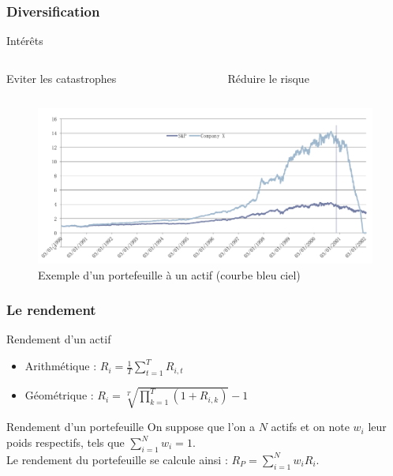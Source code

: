 \begin{frame}
    \frametitle{Diversification} 
      \begin{block}{Intérêts}
	\begin{enumerate}
	  \begin{columns}
	    \begin{column}{4cm}
	      \item Eviter les catastrophes
	    \end{column}
	    \begin{column}{4cm}
	      \item Réduire le risque	   
	    \end{column}
	  \end{columns}
	\end{enumerate}
      \end{block}
      \begin{figure}
	  \includegraphics[scale=0.2]{images/exempleChuteEntreprise.png}   
	  \caption{Exemple d'un portefeuille à un actif (courbe bleu ciel)}
      \end{figure}  
\end{frame}



\begin{frame}
    \frametitle{Le rendement} 
    \begin{block}{Rendement d'un actif}
	\begin{itemize}
	 \item Arithmétique :  $R_{i} = \frac{1}{T} \sum_{t=1}^T R_{i,t}$
	 \item Géométrique :  $ R_{i} = \sqrt[T]{\prod_{k=1}^{T}(1+R_{i,k})}-1$
	\end{itemize}
    \end{block}
    \begin{block}{Rendement d'un portefeuille}
	On suppose que l'on a $N$ actifs et on note $w_i$ leur poids respectifs, tels que $\sum_{i=1}^{N}w_i =1$.\\
	Le rendement du portefeuille se calcule ainsi :	$R_P = \sum_{i=1}^{N}w_iR_i$.
    \end{block}
\end{frame}

